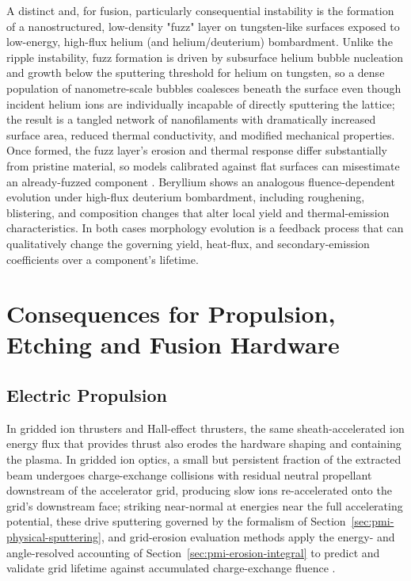 A distinct and, for fusion, particularly consequential instability is the formation of a nanostructured, low-density "fuzz" layer on tungsten-like surfaces exposed to low-energy, high-flux helium (and helium/deuterium) bombardment. Unlike the ripple instability, fuzz formation is driven by subsurface helium bubble nucleation and growth below the sputtering threshold for helium on tungsten, so a dense population of nanometre-scale bubbles coalesces beneath the surface even though incident helium ions are individually incapable of directly sputtering the lattice; the result is a tangled network of nanofilaments with dramatically increased surface area, reduced thermal conductivity, and modified mechanical properties. Once formed, the fuzz layer's erosion and thermal response differ substantially from pristine material, so models calibrated against flat surfaces can misestimate an already-fuzzed component \cite{ref0190}. Beryllium shows an analogous fluence-dependent evolution under high-flux deuterium bombardment, including roughening, blistering, and composition changes that alter local yield and thermal-emission characteristics. In both cases morphology evolution is a feedback process that can qualitatively change the governing yield, heat-flux, and secondary-emission coefficients over a component's lifetime.

\section{Consequences for Propulsion, Etching and Fusion Hardware}
\label{sec:pmi-consequences}

\subsection{Electric Propulsion}

In gridded ion thrusters and Hall-effect thrusters, the same sheath-accelerated ion energy flux that provides thrust also erodes the hardware shaping and containing the plasma. In gridded ion optics, a small but persistent fraction of the extracted beam undergoes charge-exchange collisions with residual neutral propellant downstream of the accelerator grid, producing slow ions re-accelerated onto the grid's downstream face; striking near-normal at energies near the full accelerating potential, these drive sputtering governed by the formalism of Section~\ref{sec:pmi-physical-sputtering}, and grid-erosion evaluation methods apply the energy- and angle-resolved accounting of Section~\ref{sec:pmi-erosion-integral} to predict and validate grid lifetime against accumulated charge-exchange fluence \cite{ref0463}.

